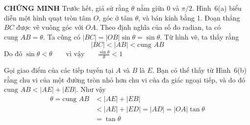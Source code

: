 \begin{minipage}[t]{0.71\textwidth}
  \noindent
  \textbf{\textsf{\color{stewartred}CHỨNG MINH}} \quad Trước hết, giả sử rằng $\theta$ nằm giữa $0$ và $\pi/2$. Hình~6(a) biểu diễn một hình quạt tròn tâm $O$, góc ở tâm $\theta$, và bán kính bằng 1. Đoạn thẳng $BC$ được vẽ vuông góc với $OA$. Theo định nghĩa của số đo radian, ta có $\text{cung } AB = \theta$. Ta cũng có $|BC| = |OB|\sin\theta = \sin\theta$. Từ hình vẽ, ta thấy rằng
  \[
    |BC| < |AB| < \text{cung } AB
  \]
  \noindent
  Do đó \hfill $\displaystyle \sin\theta < \theta \qquad \text{vì vậy} \qquad \frac{\sin\theta}{\theta} < 1$ \hfill\null

  \vspace{0.5em}
  \noindent
  Gọi giao điểm của các tiếp tuyến tại $A$ và $B$ là $E$. Bạn có thể thấy từ Hình~6(b) rằng chu vi của một đường tròn nhỏ hơn chu vi của đa giác ngoại tiếp, và do đó $\text{cung } AB < |AE| + |EB|$. Như vậy
  \begin{align*}
    \theta = \text{cung } AB &< |AE| + |EB| \\
    &< |AE| + |ED| = |AD| = |OA|\tan\theta \\
    &= \tan\theta
  \end{align*}
\end{minipage}
